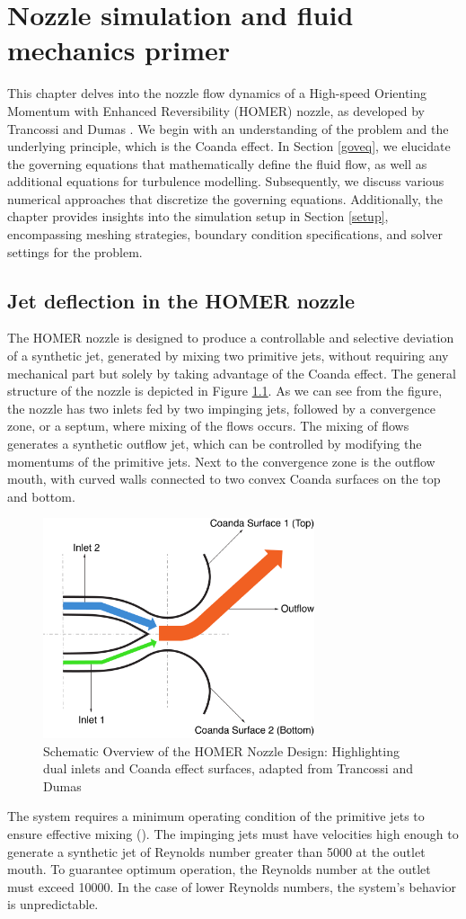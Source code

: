 \chapter{Nozzle simulation and fluid mechanics primer}
\label{chap:Theory-CFD}
This chapter delves into the nozzle flow dynamics of a High-speed Orienting Momentum with Enhanced Reversibility (HOMER) nozzle, as developed by Trancossi and Dumas \cite{trandum}. We begin with an understanding of the problem and the underlying principle, which is the Coanda effect. In Section \ref{goveq}, we elucidate the governing equations that mathematically define the fluid flow, as well as additional equations for turbulence modelling. Subsequently, we discuss various numerical approaches that discretize the governing equations. Additionally, the chapter provides insights into the simulation setup in Section \ref{setup}, encompassing meshing strategies, boundary condition specifications, and solver settings for the problem. 
\section{Jet deflection in the HOMER nozzle}  
The HOMER nozzle is designed to produce a controllable and selective deviation of a synthetic jet, generated by mixing two primitive jets, without requiring any mechanical part but solely by taking advantage of the Coanda effect. The general structure of the nozzle is depicted in Figure \ref{fig:nozzle}. As we can see from the figure, the nozzle has two inlets fed by two impinging jets, followed by a convergence zone, or a septum, where mixing of the flows occurs. The mixing of flows generates a synthetic outflow jet, which can be controlled by modifying the momentums of the primitive jets. Next to the convergence zone is the outflow mouth, with curved walls connected to two convex Coanda surfaces on the top and bottom.
\begin{figure}[ht]
  \centering
  \includegraphics[width=8cm]{images/Theory-CFD/nozzle.png}
  \caption{Schematic Overview of the HOMER Nozzle Design: Highlighting dual inlets and Coanda effect surfaces, adapted from Trancossi and Dumas \cite{trandum}}
  \label{fig:nozzle}
\end{figure}
The system requires a minimum operating condition of the primitive jets to ensure effective mixing (\cite{trandum}). The impinging jets must have velocities high enough to generate a synthetic jet of Reynolds number greater than 5000 at the outlet mouth. To guarantee optimum operation, the Reynolds number at the outlet must exceed 10000. In the case of lower Reynolds numbers, the system's behavior is unpredictable. 
